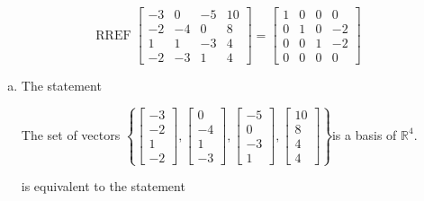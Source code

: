 \begin{exerciseAnswer} 


\[\operatorname{RREF} \left[\begin{array}{cccc}
-3 & 0 & -5 & 10 \\
-2 & -4 & 0 & 8 \\
1 & 1 & -3 & 4 \\
-2 & -3 & 1 & 4
\end{array}\right] = \left[\begin{array}{cccc}
1 & 0 & 0 & 0 \\
0 & 1 & 0 & -2 \\
0 & 0 & 1 & -2 \\
0 & 0 & 0 & 0
\end{array}\right] \]


\begin{enumerate}[(a)]
\item The statement 
\begin{center}\begin{minipage}{0.8\textwidth}
 The set of vectors \( \left\{ \left[\begin{array}{c}
-3 \\
-2 \\
1 \\
-2
\end{array}\right] , \left[\begin{array}{c}
0 \\
-4 \\
1 \\
-3
\end{array}\right] , \left[\begin{array}{c}
-5 \\
0 \\
-3 \\
1
\end{array}\right] , \left[\begin{array}{c}
10 \\
8 \\
4 \\
4
\end{array}\right] \right\} \)is a basis of \(\mathbb{R}^4\). 
\end{minipage}\end{center}
     is equivalent to the statement 
\begin{center}\begin{minipage}{0.8\textwidth}
 The set of vectors \( \left\{ \left[\begin{array}{c}
-3 \\
-2 \\

\end{array}
\end{minipage}
\end{center}
\end{enumerate}
\end{exerciseAnswer}
